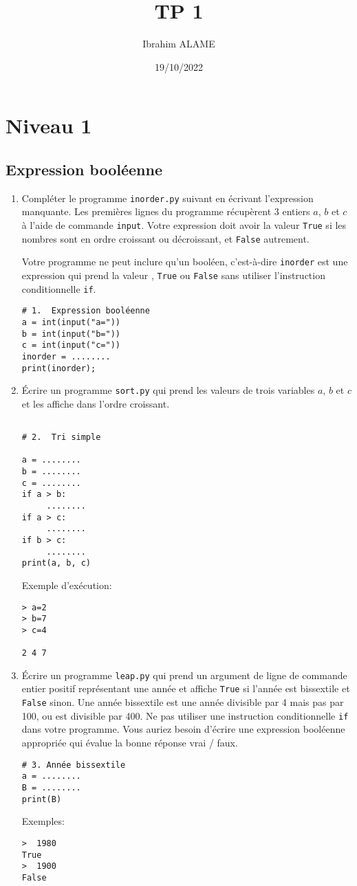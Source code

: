 \documentclass[a4paper]{article}
\title{TP 1}
\author{Ibrahim ALAME}
\date{19/10/2022}
\begin{document}
\maketitle


\section{Niveau 1}
\subsection{Expression booléenne}
\begin{enumerate}
\item Compléter le programme {\tt inorder.py} suivant en écrivant l'expression manquante. Les premières lignes du programme récupèrent 3 entiers $a$, $b$ et $c$ à l'aide de commande {\tt input}. Votre expression doit avoir la valeur {\tt True} si les nombres sont en ordre croissant ou décroissant, et {\tt False} autrement.

Votre programme ne peut inclure qu'un booléen, c'est-à-dire  {\tt inorder}  est une expression qui prend la valeur ,  {\tt True} ou  {\tt False} sans utiliser l'instruction conditionnelle  {\tt if}.
\begin{lstlisting}
# 1.  Expression booléenne
a = int(input("a="))
b = int(input("b="))
c = int(input("c="))
inorder = ........
print(inorder);

\end{lstlisting}


\item Écrire un programme {\tt sort.py} qui prend les valeurs de trois variables $a$, $b$ et $c$ et les affiche dans l'ordre croissant.
\begin{lstlisting}

# 2.  Tri simple

a = ........
b = ........
c = ........
if a > b:
     ........
if a > c:
     ........
if b > c:
     ........
print(a, b, c)

\end{lstlisting}

Exemple d'exécution:

\begin{verbatim}
> a=2
> b=7
> c=4

2 4 7
\end{verbatim}

\item Écrire un programme {\tt leap.py} qui prend un argument de ligne de commande entier positif représentant une année et affiche {\tt True} si l'année est bissextile et {\tt False} sinon. Une année bissextile est une année divisible par 4 mais pas par 100, ou est divisible par 400. Ne pas utiliser une instruction conditionnelle {\tt if} dans votre programme. Vous auriez besoin d'écrire une expression booléenne appropriée qui évalue la bonne réponse vrai / faux.
\begin{lstlisting}
# 3. Année bissextile
a = ........
B = ........
print(B)
\end{lstlisting}
Exemples:
\begin{verbatim}
>  1980
True
>  1900
False
\end{verbatim}
\end{enumerate}
\end{document}
